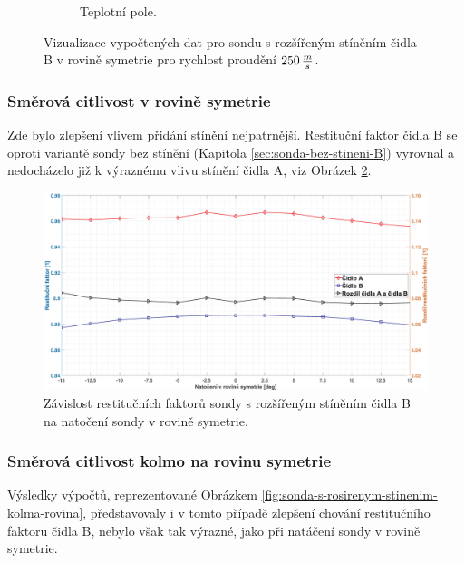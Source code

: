 \begin{figure}[ht!]
\begin{subfigure}{0.45\textwidth}
                    \caption{Teplotní pole.}
                \end{subfigure}
                \caption{Vizualizace vypočtených dat pro sondu s rozšířeným stíněním čidla B v rovině symetrie pro rychlost proudění $250 \, \frac{m}{s}$.}
                \label{fig:sonda-s-rozsirenym-stinenim-B-vizualizace}
            \end{figure}
        \newpage
        \subsubsection{Směrová citlivost v rovině symetrie}
            Zde bylo zlepšení vlivem přidání stínění nejpatrnější. Restituční faktor čidla B se oproti variantě sondy bez stínění (Kapitola \ref{sec:sonda-bez-stineni-B}) vyrovnal a nedocházelo již k výraznému vlivu stínění čidla A, viz Obrázek \ref{fig:sonda-s-rosirenym-stinenim-rovina-symetrie}.
            
            \begin{figure}[ht!]
                \centering
                \includegraphics*[width=\textwidth]{400_SIMULACE_KONSTRUKCNICH_UPRAV/Grafy/03_rovina_symetrie}
                \caption{Závislost restitučních faktorů sondy s rozšířeným stíněním čidla B na natočení sondy v rovině symetrie.}
                \label{fig:sonda-s-rosirenym-stinenim-rovina-symetrie}
            \end{figure}
        \subsubsection{Směrová citlivost kolmo na rovinu symetrie}
            Výsledky výpočtů, reprezentované Obrázkem \ref{fig:sonda-s-rosirenym-stinenim-kolma-rovina}, představovaly i v tomto případě zlepšení chování restitučního faktoru čidla B, nebylo však tak výrazné, jako při natáčení sondy v rovině symetrie.
            
